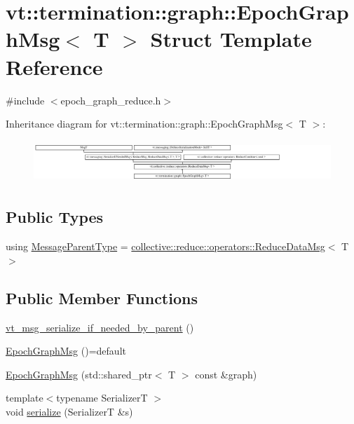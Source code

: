 \hypertarget{structvt_1_1termination_1_1graph_1_1_epoch_graph_msg}{}\section{vt\+:\+:termination\+:\+:graph\+:\+:Epoch\+Graph\+Msg$<$ T $>$ Struct Template Reference}
\label{structvt_1_1termination_1_1graph_1_1_epoch_graph_msg}


{\ttfamily \#include $<$epoch\+\_\+graph\+\_\+reduce.\+h$>$}

Inheritance diagram for vt\+:\+:termination\+:\+:graph\+:\+:Epoch\+Graph\+Msg$<$ T $>$\+:\begin{figure}[H]
\begin{center}
\leavevmode
\includegraphics[height=1.605735cm]{structvt_1_1termination_1_1graph_1_1_epoch_graph_msg}
\end{center}
\end{figure}
\subsection*{Public Types}
\begin{DoxyCompactItemize}
\item 
using \hyperlink{structvt_1_1termination_1_1graph_1_1_epoch_graph_msg_a0659cb5d784ca54bb1d360ccf2293493}{Message\+Parent\+Type} = \hyperlink{structvt_1_1collective_1_1reduce_1_1operators_1_1_reduce_data_msg}{collective\+::reduce\+::operators\+::\+Reduce\+Data\+Msg}$<$ T $>$
\end{DoxyCompactItemize}
\subsection*{Public Member Functions}
\begin{DoxyCompactItemize}
\item 
\hyperlink{structvt_1_1termination_1_1graph_1_1_epoch_graph_msg_a88e8c54930cda6396ffcec2d1223b97f}{vt\+\_\+msg\+\_\+serialize\+\_\+if\+\_\+needed\+\_\+by\+\_\+parent} ()
\item 
\hyperlink{structvt_1_1termination_1_1graph_1_1_epoch_graph_msg_a7dd7c3313549d4d61f614bc1ec38a13b}{Epoch\+Graph\+Msg} ()=default
\item 
\hyperlink{structvt_1_1termination_1_1graph_1_1_epoch_graph_msg_a3d594c68531bdbc1b114f4b52557d648}{Epoch\+Graph\+Msg} (std\+::shared\+\_\+ptr$<$ T $>$ const \&graph)
\item 
{\footnotesize template$<$typename SerializerT $>$ }\\void \hyperlink{structvt_1_1termination_1_1graph_1_1_epoch_graph_msg_af799d374db4de6b194128e4032e3d412}{serialize} (SerializerT \&s)
\end{DoxyCompactItemize}
